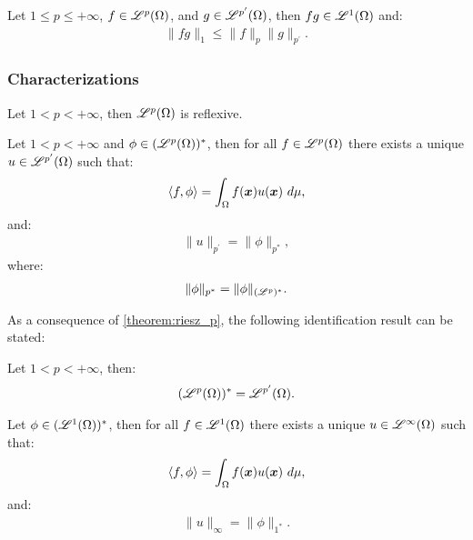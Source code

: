 \begin{theorem}
    Let $1 \leq p \leq +\infty$, $f \in \mathscr{L}^{p}(\Omega)$, and $g \in \mathscr{L}^{p^{\prime}}(\Omega)$, then $fg \in \mathscr{L}^{1}(\Omega)$ and:
    \begin{gather}
        \lVert fg \rVert_1 \leq \lVert f \rVert_p \lVert g \rVert_{p^{\prime}}.
    \end{gather}
\end{theorem}

\subsubsection{Characterizations}

\begin{theorem}
    Let $1 < p < +\infty$, then $\mathscr{L}^{p}(\Omega)$ is reflexive.
\end{theorem}

\begin{theorem} \label{theorem:riesz_p}
    Let $1 < p < +\infty$ and $\phi \in (\mathscr{L}^{p}(\Omega))^*$, then for all $f \in \mathscr{L}^{p}(\Omega)$ there exists a unique $u \in \mathscr{L}^{p^{\prime}}(\Omega)$ such that:
    \begin{gather}
        \langle f, \phi \rangle = \int_{\Omega} f(\bm{x}) u(\bm{x}) ~ d \mu,
    \end{gather}
    and:
    \begin{gather}
        \lVert u \rVert_{p^{\prime}} = \lVert \phi \rVert_{p^{*}},
    \end{gather}
    where:
    \begin{gather}
        \lVert \phi \rVert_{p^{*}} = \lVert \phi \rVert_{(\mathscr{L}^{p})^*}.
    \end{gather}
\end{theorem}

As a consequence of \autoref{theorem:riesz_p}, the following identification result can be stated:

\begin{theorem}
    Let $1 < p < +\infty$, then:
    \begin{gather}
        (\mathscr{L}^{p}(\Omega))^* = \mathscr{L}^{p^{\prime}}(\Omega).
    \end{gather}
\end{theorem}

\begin{theorem}[Riesz representation theorem for $p = 1$] \label{theorem:riesz_1}
    Let $\phi \in (\mathscr{L}^{1}(\Omega))^*$, then for all $f \in \mathscr{L}^{1}(\Omega)$ there exists a unique $u \in \mathscr{L}^{\infty}(\Omega)$ such that:
    \begin{gather}
        \langle f, \phi \rangle = \int_{\Omega} f(\bm{x}) u(\bm{x}) ~ d \mu,
    \end{gather}
    and:
    \begin{gather}
        \lVert u \rVert_{\infty} = \lVert \phi \rVert_{1^{*}}.
    \end{gather}
\end{theorem}

